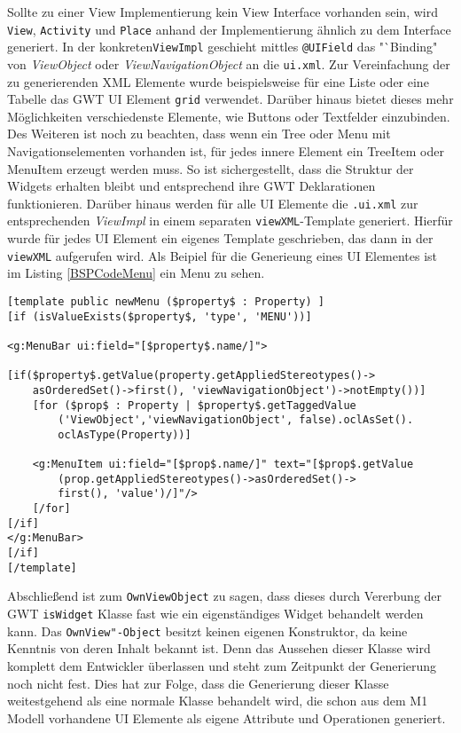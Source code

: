 Sollte zu einer View Implementierung kein View Interface vorhanden sein, wird \texttt{View}, \texttt{Activity} und \texttt{Place} anhand der Implementierung ähnlich zu dem Interface generiert.
In der konkreten\texttt{ViewImpl} geschieht mittles \texttt{@UIField} das "`Binding" von \textit{ViewObject} oder \textit{ViewNavigationObject} an die \texttt{ui.xml}. Zur Vereinfachung der zu generierenden XML Elemente wurde beispielsweise für eine Liste oder eine Tabelle das GWT UI Element \texttt{grid} verwendet. Darüber hinaus bietet dieses mehr Möglichkeiten verschiedenste Elemente, wie Buttons oder Textfelder einzubinden. Des Weiteren ist noch zu beachten, dass wenn ein Tree oder Menu mit Navigationselementen vorhanden ist, für jedes innere Element ein TreeItem oder MenuItem erzeugt werden muss. So ist sichergestellt, dass die Struktur der Widgets erhalten bleibt und entsprechend ihre GWT Deklarationen funktionieren.
Darüber hinaus werden für alle UI Elemente die \texttt{.ui.xml} zur entsprechenden \textit{ViewImpl} in einem separaten \texttt{viewXML}-Template generiert. Hierfür wurde für jedes UI Element ein eigenes Template geschrieben, das dann in der \texttt{viewXML} aufgerufen wird. Als Beipiel für die Generieung eines UI Elementes ist im Listing \ref{BSPCodeMenu} ein Menu zu sehen.
\lstset{language=mtl}
\begin{lstlisting}[caption={Template für die XML - Generierung eines Menus}, label={BSPCodeMenu}]
[template public newMenu ($property$ : Property) ]
[if (isValueExists($property$, 'type', 'MENU'))]

<g:MenuBar ui:field="[$property$.name/]">

[if($property$.getValue(property.getAppliedStereotypes()->
	asOrderedSet()->first(), 'viewNavigationObject')->notEmpty())]
	[for ($prop$ : Property | $property$.getTaggedValue
		('ViewObject','viewNavigationObject', false).oclAsSet().
		oclAsType(Property))]

	<g:MenuItem ui:field="[$prop$.name/]" text="[$prop$.getValue
		(prop.getAppliedStereotypes()->asOrderedSet()->
		first(), 'value')/]"/>
	[/for]
[/if]
</g:MenuBar>
[/if]
[/template]
\end{lstlisting}
Abschließend ist zum \texttt{OwnViewObject} zu sagen, dass dieses durch Vererbung der GWT \texttt{isWidget} Klasse fast wie ein eigenständiges Widget behandelt werden kann. Das \texttt{OwnView"-Object} besitzt keinen eigenen Konstruktor, da keine Kenntnis von deren Inhalt bekannt ist. Denn das Aussehen dieser Klasse wird komplett dem Entwickler überlassen und steht zum Zeitpunkt der Generierung noch nicht fest. Dies hat zur Folge, dass die Generierung dieser Klasse weitestgehend als eine normale Klasse behandelt wird, die schon aus dem M1 Modell vorhandene UI Elemente als eigene Attribute und Operationen generiert. 
